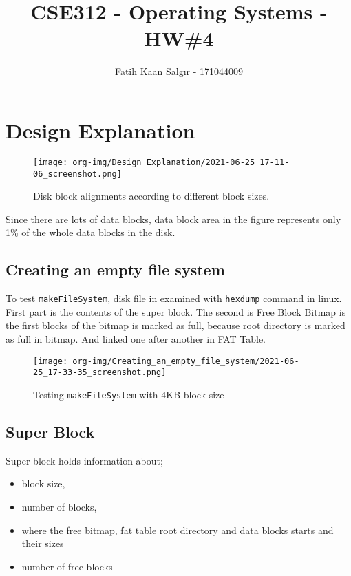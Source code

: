 \documentclass[a4paper]{article}
\author{Fatih Kaan Salgır - 171044009}
\date{}
\title{CSE312 - Operating Systems - HW\#4}
\begin{document}
\maketitle

\section*{Design Explanation}
\label{sec:orgd6e44a3}

\begin{figure}[htbp]
\centering
\texttt{[image: org-img/Design\_Explanation/2021-06-25\_17-11-06\_screenshot.png]}
\caption{Disk block alignments according to different block sizes.}
\end{figure}


Since there are lots of data blocks, data block area in the figure represents only 1\% of the whole data blocks in the disk.


\subsection*{Creating an empty file system}
\label{sec:orgb802c58}

To test \texttt{makeFileSystem}, disk file in examined with \texttt{hexdump} command in linux. First part is the  contents of the super block. The second is Free Block Bitmap is the first blocks of the bitmap is marked as full, because root directory is marked as full in bitmap. And linked one after another in FAT Table.

\begin{figure}[htbp]
\centering
\texttt{[image: org-img/Creating\_an\_empty\_file\_system/2021-06-25\_17-33-35\_screenshot.png]}
\caption{Testing \texttt{makeFileSystem} with 4KB block size}
\end{figure}

\newpage

\subsection*{Super Block}
\label{sec:org0aa5c65}

Super block holds information about;
\begin{itemize}
\item block size,
\item number of blocks,
\item where the free bitmap, fat table root directory and data blocks starts and their sizes
\item number of free blocks
\end{itemize}
\end{document}
